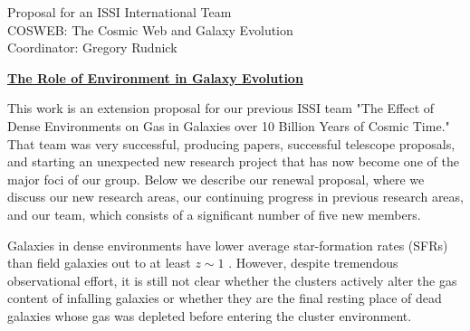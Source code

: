 \documentclass[11pt]{article}
\newcommand{\HRule}{\rule{\linewidth}{0.3mm}}
\begin{document}






\begin{center}
\large{Proposal for an ISSI International Team}\\
\Large{COSWEB: The Cosmic Web and Galaxy Evolution}\\
\medskip
\vspace{-0.2cm}
\large{Coordinator: Gregory Rudnick}\\
\end{center}


\newpage

\centerline{{\bf \underline{ The Role of Environment in Galaxy Evolution}}}
\medskip

This work is an extension proposal for our previous ISSI team "The Effect of Dense Environments on Gas in Galaxies over 10 Billion Years of Cosmic Time."  That team was very successful, producing papers, successful telescope proposals, and starting an unexpected new research project that has now become one of the major foci of our group.  Below we describe our renewal proposal, where we discuss our new research areas, our continuing progress in previous research areas, and our team, which consists of a significant number of five new members.

 Galaxies in dense environments
have lower average star-formation rates (SFRs) than field galaxies out
to at least $z \sim 1$ \citep[e.g.][]{Poggianti99,Lewis02,Gomez03,Postman05}.
However, despite tremendous observational effort, it
is still not clear whether the clusters actively alter the gas content
of infalling galaxies or whether they are the final resting place of
dead galaxies whose gas was depleted before entering the cluster
environment.
\end{document}

